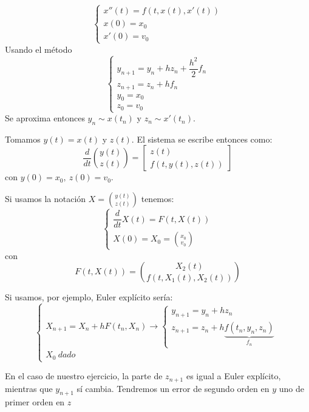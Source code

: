 \documentclass[openany]{book}
\begin{document}
    \begin{exercise}
        $$ \left\{
        \begin{array}{l}
            x''(t) = f(t,x(t),x'(t)) \\
            x(0) = x_0\\
            x'(0) = v_0
        \end{array}
        \right. $$
        Usando el método
        $$ \left\{
        \begin{array}{l}
            y_{n+1} = y_n+hz_n+\dfrac{h^2}{2}f_n\\
            z_{n+1} = z_n+hf_n\\
            y_0=x_0\\
            z_0=v_0
        \end{array}
        \right. $$
        Se aproxima entonces $ y_n \sim x(t_n) $ y $ z_n \sim x'(t_n) $.
        
        Tomamos $ y(t) = x(t) $ y $ z(t) $. El sistema se escribe entonces como:
        $$ \dfrac{d}{dt} \binom{y(t)}{z(t)} = \left[ \begin{matrix}
            z(t) \\ f(t,y(t),z(t))
        \end{matrix} \right] $$
        con $ y(0) = x_0,\ z(0) = v_0 $.

        Si usamos la notación $ X = \binom{y(t)}{z(t)} $ tenemos:
        $$ \left\{
        \begin{array}{l}
            \dfrac{d}{dt}X(t) = F(t,X(t))\\
            X(0) = X_0 = \binom{x_0}{v_0}
        \end{array}
        \right. $$
        con
        $$ F(t,X(t)) = \binom{X_2(t)}{f(t,X_1(t),X_2(t))} $$

        Si usamos, por ejemplo, Euler explícito sería:
        $$ \left\{
        \begin{array}{l}
            X_{n+1} = X_n + h F(t_n,X_n) \to \left\{
            \begin{array}{l}
                y_{n+1} = y_n+h z_n\\
                z_{n+1} = z_n+h\underbrace{f(t_n,y_n,z_n)}_{f_n}
            \end{array}
            \right.\\
            X_0\ dado
        \end{array}
        \right. $$

        En el caso de nuestro ejercicio, la parte de $ z_{n+1} $ es igual a Euler explícito, mientras que $ y_{n+1} $ sí cambia. Tendremos un error de segundo orden en $ y $ uno de primer orden en $ z $


\end{exercise}
\end{document}

